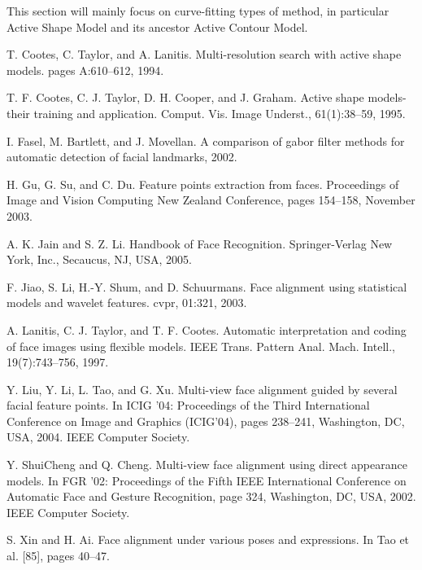 \documentclass[12pt]{report}
\begin{document}
\par
This section will mainly focus on curve-fitting types of method, in particular Active Shape Model and its ancestor Active Contour Model.

\begin{thebibliography}{9}
	T. Cootes, C. Taylor, and A. Lanitis. Multi-resolution search with active shape models. pages A:610–612, 1994. 
	
	T. F. Cootes, C. J. Taylor, D. H. Cooper, and J. Graham. Active shape models-their training and application. Comput. Vis. Image Underst., 61(1):38–59, 1995.
	
	I. Fasel, M. Bartlett, and J. Movellan. A comparison of gabor filter methods for automatic detection of facial landmarks, 2002. 
	 
	H. Gu, G. Su, and C. Du. Feature points extraction from faces. Proceedings of Image and Vision Computing New Zealand Conference, pages 154–158, November 2003. 
	
	A. K. Jain and S. Z. Li. Handbook of Face Recognition. Springer-Verlag New York, Inc., Secaucus, NJ, USA, 2005. 
	
	F. Jiao, S. Li, H.-Y. Shum, and D. Schuurmans. Face alignment using statistical models and wavelet features. cvpr, 01:321, 2003.
	
	A. Lanitis, C. J. Taylor, and T. F. Cootes. Automatic interpretation and coding of face images using flexible models. IEEE Trans. Pattern Anal. Mach. Intell., 19(7):743–756, 1997. 
	
	Y. Liu, Y. Li, L. Tao, and G. Xu. Multi-view face alignment guided by several facial feature points. In ICIG ’04: Proceedings of the Third International Conference on Image and Graphics (ICIG’04), pages 238–241, Washington, DC, USA, 2004. IEEE Computer Society. 
		
	Y. ShuiCheng and Q. Cheng. Multi-view face alignment using direct appearance models. In FGR ’02: Proceedings of the Fifth IEEE International Conference on Automatic Face and Gesture Recognition, page 324, Washington, DC, USA, 2002. IEEE Computer Society. 
		
	S. Xin and H. Ai. Face alignment under various poses and expressions. In Tao et al. [85], pages 40–47. 
\end{thebibliography}
\end{document}
